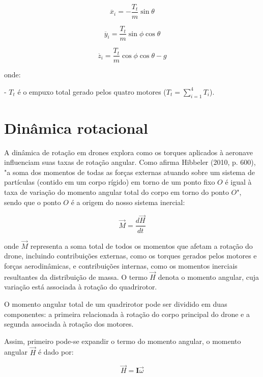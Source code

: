 \begin{equation}
\ddot{x_i} = -\frac{T_t}{m} \sin\theta
\end{equation}

\begin{equation}
\ddot{y_i} = \frac{T_t}{m} \sin\phi \cos\theta
\end{equation}

\begin{equation}
\ddot{z_i} = \frac{T_t}{m} \cos\phi \cos\theta - g
\end{equation}

onde:

- \(T_t\) é o empuxo total gerado pelos quatro motores (\(T_t = \sum_{i=1}^{4} T_i\)).

\section{Dinâmica rotacional}

A dinâmica de rotação em drones explora como os torques aplicados à aeronave influenciam suas taxas de rotação angular. Como afirma Hibbeler (2010, p. 600), "a soma dos momentos de todas as forças externas atuando sobre um sistema de partículas (contido em um corpo rígido) em torno de um ponto fixo \(O\) é igual à taxa de variação do momento angular total do corpo em torno do ponto \(O\)", sendo que o ponto \(O\) é a origem do nosso sistema inercial:

\begin{equation}
\vec{M} = \frac{d\vec{H}}{dt}
\end{equation}

onde \(\vec{M}\) representa a soma total de todos os momentos que afetam a rotação do drone, incluindo contribuições externas, como os torques gerados pelos motores e forças aerodinâmicas, e contribuições internas, como os momentos inerciais resultantes da distribuição de massa. O termo \(\vec{H}\) denota o momento angular, cuja variação está associada à rotação do quadrirotor.

O momento angular total de um quadrirotor pode ser dividido em duas componentes: a primeira relacionada à rotação do corpo principal do drone e a segunda associada à rotação dos motores.

Assim, primeiro pode-se expandir o termo do momento angular, o momento angular \(\vec{H}\) é dado por:

\begin{equation}
	\vec{H} = \mathbf{I} \vec{\omega}
\end{equation}

